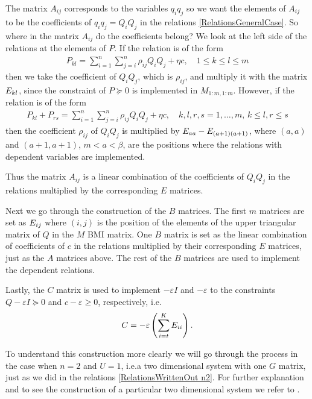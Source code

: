 \documentclass[a4paper,12pt,twoside,BCOR=10mm]{scrbook}
\begin{document}
The matrix $A_{ij}$ corresponds to the variables $q_iq_j$ so we want the elements of $A_{ij}$ to be the coefficients of $q_iq_j = Q_iQ_j$ in the relations \eqref{RelationsGeneralCase}. So where in the matrix $A_{ij}$ do the coefficients belong? We look at the left side of the relations at the elements of $P$. If the relation is of the form
\begin{align*}
    P_{kl} = \sum_{i = 1}^n\sum_{j = i}^n \rho_{ij}Q_iQ_j + \eta c, \quad 1 \leq k \leq l \leq m
\end{align*}
then we take the coefficient of $Q_iQ_j$, which is $\rho_{ij}$, and multiply it with the matrix $E_{kl}$, since the constraint of $P \succeq 0$ is implemented in $M_{1:m, 1:m}$. However, if the relation is of the form
\begin{align*}
    P_{kl} + P_{rs} = \sum_{i = 1}^n\sum_{j = i}^n \rho_{ij}Q_iQ_j + \eta c, \quad k,l,r,s = 1, \ldots, m, \, k \leq l, r\leq s
\end{align*}
then the coefficient $\rho_{ij}$ of $Q_i Q_j$ is multiplied by $E_{aa} - E_{(a+1)(a+1)}$, where $(a,a)$ and $(a+1,a+1)$, $m < a < \beta$, are the positions where the relations with dependent variables are implemented.

Thus the matrix $A_{ij}$ is a linear combination of the coefficients of $Q_iQ_j$ in the relations multiplied by the corresponding $E$ matrices.

Next we go through the construction of the $B$ matrices. The first $m$ matrices are set as $E_{ij}$ where $(i,j)$ is the position of the elements of the upper triangular matrix of $Q$ in the $M$ BMI matrix. One $B$ matrix is set as the linear combination of coefficients of $c$ in the relations multiplied by their corresponding $E$ matrices, just as the $A$ matrices above. The rest of the $B$ matrices are used to implement the dependent relations.

Lastly, the $C$ matrix is used to implement $-\varepsilon I$ and $-\varepsilon$ to the constraints $Q - \varepsilon I \succeq 0$ and $c - \varepsilon \geq 0$, respectively, i.e.
\begin{align*}
    C = -\varepsilon\left(\sum_{i = t}^K E_{ii}\right).
\end{align*}

To understand this construction more clearly we will go through the process in the case when $n = 2$ and $U = 1$, i.e.\@ a two dimensional system with one $G$ matrix, just as we did in the relations \eqref{RelationsWrittenOut n2}. For further explanation and to see the construction of a particular two dimensional system we refer to \citep{Ha2019BMI}.
\end{document}
